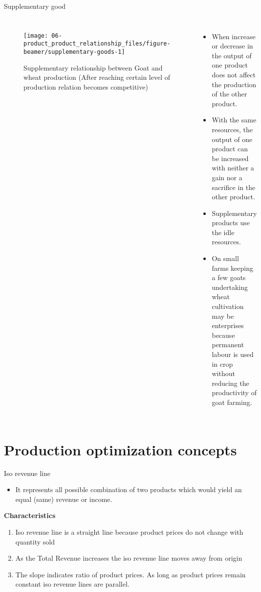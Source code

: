 \documentclass[12pt,ignorenonframetext,aspectratio=169]{beamer}
\providecommand{\tightlist}{%
  \setlength{\itemsep}{0pt}\setlength{\parskip}{0pt}}
\begin{document}
\begin{frame}{Supplementary good}
\protect\hypertarget{supplementary-good}{}
\begin{columns}

\begin{figure}

{\centering \texttt{[image: 06-product\_product\_relationship\_files/figure-beamer/supplementary-goods-1]} 

}

\caption{Supplementary relationship between Goat and wheat production (After reaching certain level of production relation becomes competitive)}\label{fig:supplementary-goods}
\end{figure}

  \footnotesize
  
  \begin{itemize}
  \item When increase or decrease in the output of one product does not affect the production of the other product.
  \item With the same resources, the output of one product can be increased with neither a gain nor a sacrifice in the other product.
  \item Supplementary products use the idle resources. 
  \item On small farms keeping a few goats undertaking wheat cultivation may be enterprises because permanent labour is used in crop without reducing the productivity of goat farming.
  \end{itemize}

\end{columns}
\end{frame}

\hypertarget{production-optimization-concepts}{%
\section{Production optimization
concepts}\label{production-optimization-concepts}}

\begin{frame}{Iso revenue line}
\protect\hypertarget{iso-revenue-line}{}
\begin{itemize}
\tightlist
\item
  It represents all possible combination of two products which would
  yield an equal (same) revenue or income.
\end{itemize}

\textbf{Characteristics}

\begin{enumerate}
\tightlist
\item
  Iso revenue line is a straight line because product prices do not
  change with quantity sold
\item
  As the Total Revenue increases the iso revenue line moves away from
  origin
\item
  The slope indicates ratio of product prices. As long as product prices
  remain constant iso revenue lines are parallel.
\end{enumerate}
\end{frame}
\end{document}
